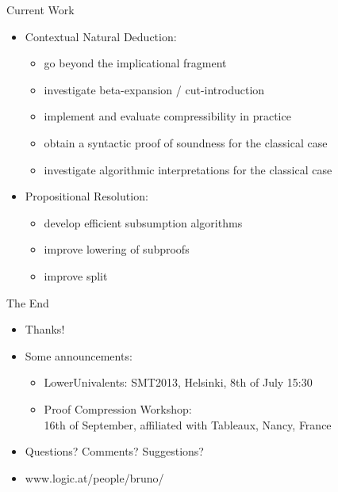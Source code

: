 \documentclass[9pt]{beamer}
\newcommand{\mypause}{\pause}
\begin{document}
\begin{frame}{Current Work}

\begin{itemize}
\item Contextual Natural Deduction:
	\begin{itemize}
	\item go beyond the implicational fragment
	\mypause
	\item investigate beta-expansion / cut-introduction
	\mypause
	\item implement and evaluate compressibility in practice
	\mypause
	\item obtain a syntactic proof of soundness for the classical case
	\mypause
	\item investigate algorithmic interpretations for the classical case
	\end{itemize}
\item Propositional Resolution:
	\begin{itemize}
	\item develop efficient subsumption algorithms
  \mypause
	\item improve lowering of subproofs
  \mypause
	\item improve split
	\end{itemize}
\end{itemize}
\end{frame}


\begin{frame}{The End}
\begin{itemize}
\item Thanks!
\item Some announcements:
	\begin{itemize}
	\item LowerUnivalents: SMT2013, Helsinki, 8th of July 15:30
	\item Proof Compression Workshop: \\
	16th of September, affiliated with Tableaux, Nancy, France
	\end{itemize}
\item Questions? Comments? Suggestions?
\item www.logic.at/people/bruno/
\end{itemize}



\end{frame}
\end{document}
